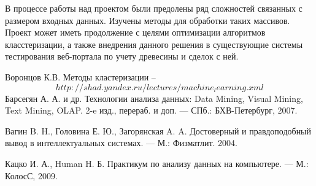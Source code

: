 \documentclass[a4paper]{article}
\begin{document}
В процессе работы над проектом были предолены ряд сложностей связанных с размером входных данных. Изучены методы для обработки таких массивов. \\

Проект может иметь продолжение с целями оптимизации алгоритмов класстеризации, а также внедрения данного решения в существующие системы тестирования веб-портала по учету древесины и сделок с ней.

\newpage
\begin{thebibliography}{}
   Воронцов К.В. Методы кластеризации –  $$http://shad.yandex.ru/lectures/machine_learning.xml$$
  Барсегян А. А. и др. Технологии анализа данных: Data Mining, Visual Mining,
Text Mining, OLAP. 2-e изд.‚ перераб. и доп. — СПб.: БХВ-Петербург, 2007.

  Вагин B. H., Головина Е. Ю.‚ Загорянская A. A. Достоверный и правдоподобный
вывод в интеллектуальных системах. — М.: Физматлит. 2004.

  Кацко И. А., Human H. Б. Практикум по анализу данных на компьютере. — М.:
КолосС, 2009.

\end{thebibliography}
\end{document}
